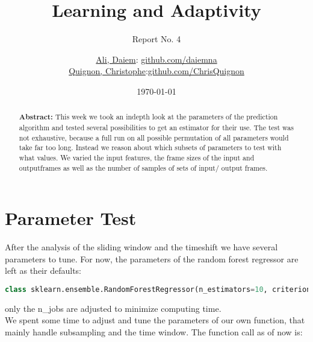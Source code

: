\documentclass{scrartcl}
\begin{document}
\title{Learning and Adaptivity}
\subtitle{Report No. 4}
\author{
  \href{daiem.ali@smail.inf.h-brs.de}{Ali, Daiem}: \href{https://github.com/daiemna}{github.com/daiemna}\\
  \href{christophe.quignon@smail.inf.h-brs.de}{Quignon, Christophe}:\href{https://github.com/ChrisQuignon}{github.com/ChrisQuignon}
}
\date{\today}


\maketitle



\begin{abstract}
\textbf{Abstract:}
This week we took an indepth look at the parameters of the prediction algorithm and tested several possibilities to get an estimator for their use. The test was not exhaustive, because a full run on all possible permutation of all parameters would take far too long. Instead we reason about which subsets of parameters to test with what values. We varied the input features, the frame sizes of the input and outputframes as well as the number of samples of sets of input/ output frames. 
\end{abstract}

\section{Parameter Test}
\label{sec:parameter}
After the analysis of the sliding window and the timeshift we have several parameters to tune. For now, the parameters of the random forest regressor are left as their defaults:
\begin{lstlisting}[language=Python]
class sklearn.ensemble.RandomForestRegressor(n_estimators=10, criterion='mse', max_depth=None, min_samples_split=2, min_samples_leaf=1, min_weight_fraction_leaf=0.0, max_features='auto', max_leaf_nodes=None, bootstrap=True, oob_score=False, n_jobs=1, random_state=None, verbose=0, warm_start=False)
\end{lstlisting}

only  the n\_jobs are adjusted to minimize computing time.\\
We spent some time to adjust and tune the parameters of our own function, that mainly handle subsampling and the time window. The function call as of now is:
\end{document}
